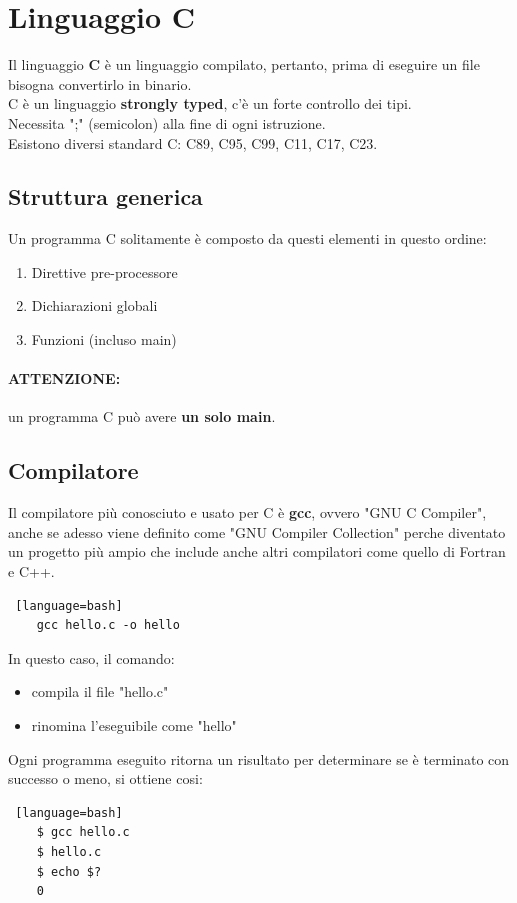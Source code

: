 \documentclass[12pt,a4paper]{article}
\let\oldsection\section
\renewcommand{\section}{\clearpage\oldsection}
\begin{document}
\section{Linguaggio C}
Il linguaggio \textbf{C} è un linguaggio compilato, pertanto, prima di eseguire un file bisogna convertirlo in binario.\\
C è un linguaggio \textbf{strongly typed}, c'è un forte controllo dei tipi.\\
Necessita ";" (semicolon) alla fine di ogni istruzione.\\
Esistono diversi standard C: C89, C95, C99, C11, C17, C23.
\subsection{Struttura generica}
Un programma C solitamente è composto da questi elementi in questo ordine:
\begin{enumerate}
    \item Direttive pre-processore
    \item Dichiarazioni globali
    \item Funzioni (incluso main)
\end{enumerate}
\paragraph{ATTENZIONE:} un programma C può avere \textbf{un solo main}.
\subsection{Compilatore}
Il compilatore più conosciuto e usato per C è \textbf{gcc}, ovvero "GNU C Compiler", anche se adesso viene definito come "GNU Compiler Collection" perche diventato un progetto più ampio che include anche altri compilatori come quello di Fortran e C++. 
\begin{lstlisting} [language=bash]
    gcc hello.c -o hello
\end{lstlisting}
In questo caso, il comando:
\begin{itemize}
    \item compila il file "hello.c"
    \item rinomina l'eseguibile come "hello"
\end{itemize}
Ogni programma eseguito ritorna un risultato per determinare se è terminato con successo o meno, si ottiene cosi:
\begin{lstlisting} [language=bash]
    $ gcc hello.c
    $ hello.c
    $ echo $?
    0
\end{lstlisting}
\end{document}

